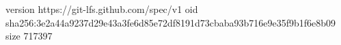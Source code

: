 version https://git-lfs.github.com/spec/v1
oid sha256:3e2a44a9237d29e43a3fe6d85e72df8191d73cbaba93b716e9e35f9b1f6e8b09
size 717397
